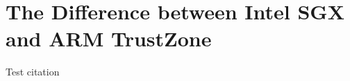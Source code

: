 \section{The Difference between Intel SGX and ARM TrustZone}\label{sec:difference}
Test citation ~\cite{rojas2004tutorial}
